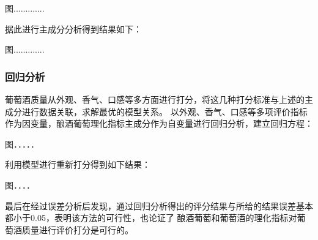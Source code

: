 \documentclass[UTF8]{ctexart}
\begin{document}
								图.............

								据此进行主成分分析得到结果如下：

								图.............
								
								\subsubsection{回归分析}
								葡萄酒质量从外观、香气、口感等多方面进行打分，将这几种打分标准与上述的主成分进行数据关联，求解最优的模型关系。
								以外观、香气、口感等多项评价指标作为因变量，酿酒葡萄理化指标主成分作为自变量进行回归分析，建立回归方程：
								
								图．．．．．

								利用模型进行重新打分得到如下结果：

								图．．．．

								最后在经过误差分析后发现，通过回归分析得出的评分结果与所给的结果误差基本都小于0.05，表明该方法的可行性，也论证了
								酿酒葡萄和葡萄酒的理化指标对葡萄酒质量进行评价打分是可行的。
							


								


									

					



					

			







		   
		   


		   
		

		
		
		
		
		
		
	
		
				
\end{document}
